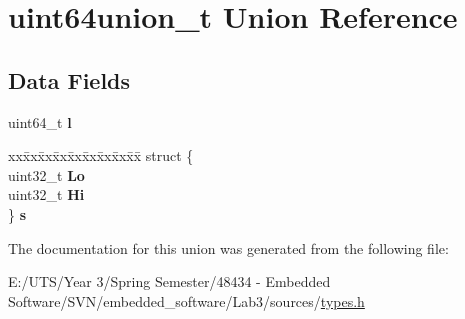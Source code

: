 \hypertarget{unionuint64union__t}{}\section{uint64union\+\_\+t Union Reference}
\label{unionuint64union__t}
\subsection*{Data Fields}
\begin{DoxyCompactItemize}
\item 
\hypertarget{unionuint64union__t_a2d5e8db071e91dd1ed90c03584facdfd}{}uint64\+\_\+t {\bfseries l}\label{unionuint64union__t_a2d5e8db071e91dd1ed90c03584facdfd}

\item 
\hypertarget{unionuint64union__t_a5d3467388059d7a11d88e7da849102f2}{}\begin{tabbing}
xx\=xx\=xx\=xx\=xx\=xx\=xx\=xx\=xx\=\kill
struct \{\\
\>uint32\_t {\bfseries Lo}\\
\>uint32\_t {\bfseries Hi}\\
\} {\bfseries s}\label{unionuint64union__t_a5d3467388059d7a11d88e7da849102f2}
\\

\end{tabbing}\end{DoxyCompactItemize}


The documentation for this union was generated from the following file\+:\begin{DoxyCompactItemize}
\item 
E\+:/\+U\+T\+S/\+Year 3/\+Spring Semester/48434 -\/ Embedded Software/\+S\+V\+N/embedded\+\_\+software/\+Lab3/sources/\hyperlink{types_8h}{types.\+h}\end{DoxyCompactItemize}
